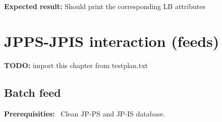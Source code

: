 \documentclass{egee}
\def\req{\noindent\textbf{Prerequisities: }}
\def\result{\noindent\textbf{Expected result: }}
\def\todo#1{\textbf{TODO:} #1}
\begin{document}
\result Should print the corresponding LB attributes


\section{JPPS-JPIS interaction (feeds)}

\todo{import this chapter from testplan.txt}




\subsection{Batch feed}

\req\ Clean JP-PS and JP-IS database.
\end{document}
